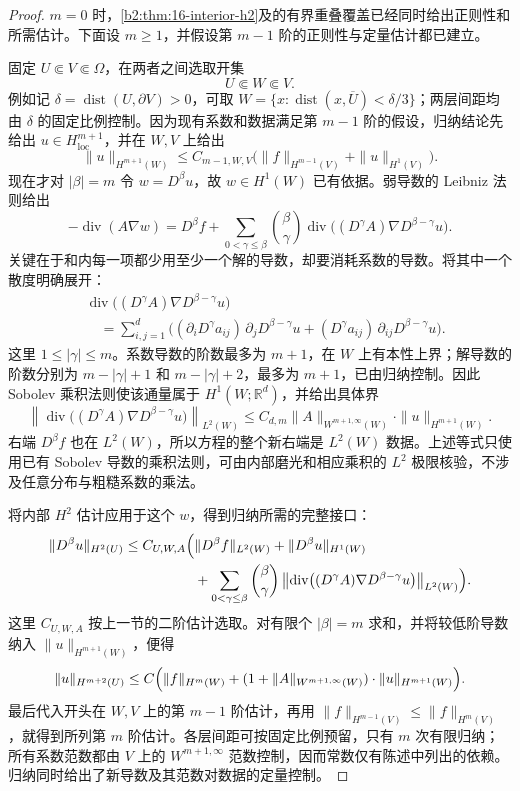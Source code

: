 \begin{proof}
\(m=0\) 时，\cref{b2:thm:16-interior-h2}及的有界重叠覆盖已经同时给出正则性和所需估计。下面设 \(m\geq1\)，并假设第 \(m-1\) 阶的正则性与定量估计都已建立。

固定 \(U\Subset V\Subset\Omega\)，在两者之间选取开集
\[
 U\Subset W\Subset V.
\]
例如记 \(\delta=\operatorname{dist}(U,\partial V)>0\)，可取
\(W=\{x:\operatorname{dist}(x,\overline U)<\delta/3\}\)；两层间距均由 \(\delta\) 的固定比例控制。因为现有系数和数据满足第 \(m-1\) 阶的假设，归纳结论先给出 \(u\in H_{\mathrm{loc}}^{m+1}\)，并在 \(W,V\) 上给出
\[
 \|u\|_{H^{m+1}(W)}
 \leq C_{m-1,W,V}
       \bigl(\|f\|_{H^{m-1}(V)}+\|u\|_{H^1(V)}\bigr).
\]
现在才对 \(|\beta|=m\) 令 \(w=D^\beta u\)，故 \(w\in H^1(W)\) 已有依据。弱导数的 Leibniz 法则给出
\[
 -\operatorname{div}(A\nabla w)
 =D^\beta f+\sum_{0<\gamma\le\beta}\binom\beta\gamma
       \operatorname{div}\bigl((D^\gamma A)\nabla D^{\beta-\gamma}u\bigr).
\]
关键在于和内每一项都少用至少一个解的导数，却要消耗系数的导数。将其中一个散度明确展开：
\[
 \begin{aligned}
 &\operatorname{div}\bigl((D^\gamma A)\nabla D^{\beta-\gamma}u\bigr)\\
 &\quad=\sum_{i,j=1}^d
 \bigl((\partial_iD^\gamma a_{ij})\,\partial_jD^{\beta-\gamma}u
       +(D^\gamma a_{ij})\,\partial_{ij}D^{\beta-\gamma}u\bigr).
 \end{aligned}
\]
这里 \(1\leq|\gamma|\leq m\)。系数导数的阶数最多为 \(m+1\)，在 \(W\) 上有本性上界；解导数的阶数分别为 \(m-|\gamma|+1\) 和 \(m-|\gamma|+2\)，最多为 \(m+1\)，已由归纳控制。因此 Sobolev 乘积法则使该通量属于 \(H^1(W;\mathbb R^d)\)，并给出具体界
\[
 \left\|\operatorname{div}\bigl((D^\gamma A)
              \nabla D^{\beta-\gamma}u\bigr)\right\|_{L^2(W)}
 \leq C_{d,m}\|A\|_{W^{m+1,\infty}(W)}
                    \cdot\|u\|_{H^{m+1}(W)}.
\]
右端 \(D^\beta f\) 也在 \(L^2(W)\)，所以方程的整个新右端是 \(L^2(W)\) 数据。上述等式只使用已有 Sobolev 导数的乘积法则，可由内部磨光和相应乘积的 \(L^2\) 极限核验，不涉及任意分布与粗糙系数的乘法。

将内部 \(H^2\) 估计应用于这个 \(w\)，得到归纳所需的完整接口：
\[
 \begin{aligned}
 \|D^\beta u\|_{H^2(U)}
 \leq C_{U,W,A}\Bigl(&\|D^\beta f\|_{L^2(W)}
                   +\|D^\beta u\|_{H^1(W)}\\
 &+\sum_{0<\gamma\leq\beta}\binom\beta\gamma
 \left\|\operatorname{div}\bigl((D^\gamma A)
                 \nabla D^{\beta-\gamma}u\bigr)\right\|_{L^2(W)}
                         \Bigr).
 \end{aligned}
\]
这里 \(C_{U,W,A}\) 按上一节的二阶估计选取。对有限个 \(|\beta|=m\) 求和，并将较低阶导数纳入 \(\|u\|_{H^{m+1}(W)}\)，便得
\[
 \|u\|_{H^{m+2}(U)}
 \leq C\Bigl(\|f\|_{H^m(W)}
       +(1+\|A\|_{W^{m+1,\infty}(W)})
                    \cdot\|u\|_{H^{m+1}(W)}\Bigr).
\]
最后代入开头在 \(W,V\) 上的第 \(m-1\) 阶估计，再用
\(\|f\|_{H^{m-1}(V)}\leq\|f\|_{H^m(V)}\)，就得到所列第 \(m\) 阶估计。各层间距可按固定比例预留，只有 \(m\) 次有限归纳；所有系数范数都由 \(V\) 上的 \(W^{m+1,\infty}\) 范数控制，因而常数仅有陈述中列出的依赖。归纳同时给出了新导数及其范数对数据的定量控制。
\end{proof}

